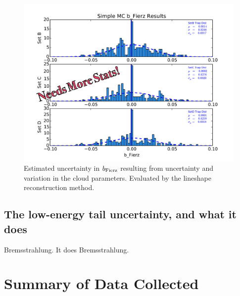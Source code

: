 	    \begin{figure}[h!!]
    	\centering
    	\includegraphics[width=.999\linewidth]
    	{Figures/Position_Err_bFierz_prelim.pdf}
    	\caption[$\bFierz$ Position Error]{Estimated uncertainty in $\bFierz$ resulting from uncertainty and variation in the cloud parameters.  Evaluated by the lineshape reconstruction method.  }		
    	\label{fig:bFierz_position_err}
		\end{figure}

	
	\subsection{The low-energy tail uncertainty, and what it does}
	Bremsstrahlung.  It does Bremsstrahlung.


\section{Summary of Data Collected}

